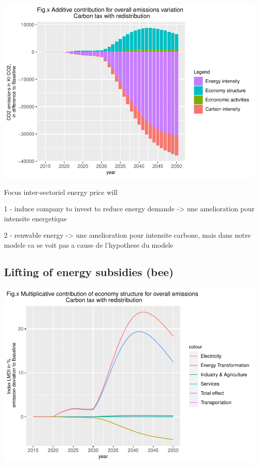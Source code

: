\documentclass[
]{article}
\begin{document}
\includegraphics{Modele-ThreeMe-Tunisie_Sequeira_Valilou_Wang_files/figure-latex/unnamed-chunk-17-1.pdf}

Focus inter-sectoriel energy price will

1 - induce company to invest to reduce energy demande -\textgreater{}
une amelioration pour intensite energetique

2 - renwable energy -\textgreater{} une amelioration pour intensite
carbone, mais dans notre modele ca se voit pas a cause de l'hypothese du
modele

\hypertarget{lifting-of-energy-subsidies-bee}{%
\subsection{Lifting of energy subsidies
(bee)}\label{lifting-of-energy-subsidies-bee}}

\includegraphics{Modele-ThreeMe-Tunisie_Sequeira_Valilou_Wang_files/figure-latex/unnamed-chunk-18-1.pdf}
\end{document}
